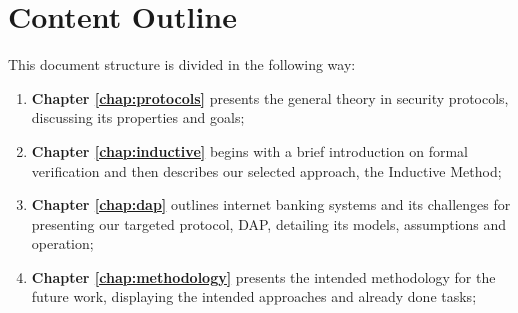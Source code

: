 \section{Content Outline}

This document structure is divided in the following way:

\begin{enumerate}
    \item \textbf{Chapter \ref{chap:protocols}} presents the general theory in security protocols, discussing its properties and goals;

    \item \textbf{Chapter \ref{chap:inductive}} begins with a brief introduction on formal verification and then describes our selected approach, the Inductive Method;

    \item \textbf{Chapter \ref{chap:dap}} outlines internet banking systems and its challenges for presenting our targeted protocol, DAP, detailing its models, assumptions and operation;

    \item \textbf{Chapter \ref{chap:methodology}} presents the intended methodology for the future work, displaying the intended approaches and already done tasks;

\end{enumerate}
